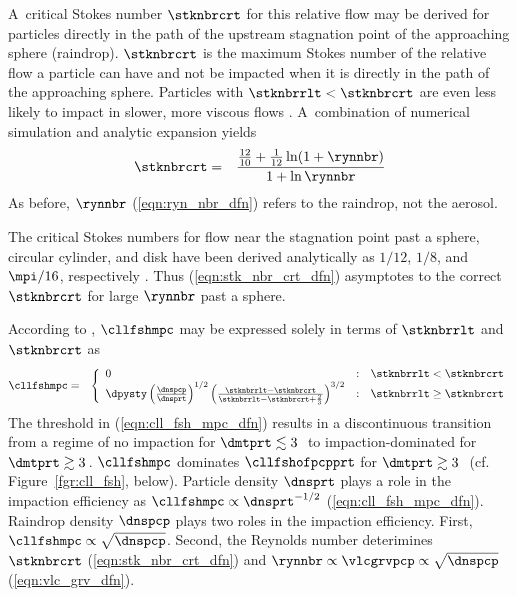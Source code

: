 \documentclass[12pt,twoside]{book}
\begin{document}
A~critical Stokes number $\stknbrcrt$ for this relative flow
may be derived for particles directly in the path of the upstream
stagnation point of the approaching sphere (raindrop). 
$\stknbrcrt$ is the maximum Stokes number of the relative flow a
particle can have and not be impacted when it is directly in the path
of the approaching sphere. 
Particles with $\stknbrrlt < \stknbrcrt$ are even less likely to impact
in slower, more viscous flows \cite[]{Sli82}.
A~combination of numerical simulation and analytic expansion yields
\begin{eqnarray}
\stknbrcrt & = & \frac{\frac{12}{10} + \frac{1}{12} \ln ( 1 + \rynnbr) }{
1 + \ln \rynnbr }
\label{eqn:stk_nbr_crt_dfn}
\end{eqnarray}
As before, $\rynnbr$ (\ref{eqn:ryn_nbr_dfn}) refers to the raindrop,
not the aerosol. 

The critical Stokes numbers for flow near the stagnation point past a
sphere, circular cylinder, and disk have been derived analytically 
as $1/12$, $1/8$, and $\mpi/16$, respectively \cite[]{Sli82}.
Thus (\ref{eqn:stk_nbr_crt_dfn}) asymptotes to the correct
$\stknbrcrt$ for large $\rynnbr$ past a sphere. 

According to \cite{Sli82}, $\cllfshmpc$ may be expressed solely in
terms of $\stknbrrlt$ and $\stknbrcrt$ as 
\begin{eqnarray}
\cllfshmpc & = & \left\{ 
\begin{array}{l@{\quad:\quad}r}
0 & \stknbrrlt < \stknbrcrt \\
\dpysty \left( \frac{\dnspcp}{\dnsprt}\right)^{1/2}
\left( \frac{\stknbrrlt - \stknbrcrt}
{\stknbrrlt - \stknbrcrt + \frac{2}{3}} \right)^{3/2} & 
\stknbrrlt \ge \stknbrcrt 
\end{array} \right.
\label{eqn:cll_fsh_mpc_dfn}
\end{eqnarray}
The threshold in (\ref{eqn:cll_fsh_mpc_dfn}) results in a
discontinuous transition from a regime of no impaction for 
$\dmtprt \lesssim 3$\,\um\ to impaction-dominated for
$\dmtprt \gtrsim 3$\,\um.
$\cllfshmpc$ dominates $\cllfshofpcpprt$ for $\dmtprt \gtrsim 3$\,\um\ 
(cf. Figure~\ref{fgr:cll_fsh}, below). 
Particle density $\dnsprt$ plays a role in the impaction efficiency 
as $\cllfshmpc \propto \dnsprt^{-1/2}$ (\ref{eqn:cll_fsh_mpc_dfn}).
Raindrop density $\dnspcp$ plays two roles in the impaction
efficiency.
First, $\cllfshmpc \propto \sqrt{\dnspcp}$.
Second, the Reynolds number deterimines $\stknbrcrt$
(\ref{eqn:stk_nbr_crt_dfn}) and $\rynnbr \propto \vlcgrvpcp \propto
\sqrt{\dnspcp}$ (\ref{eqn:vlc_grv_dfn}). 
\end{document}
